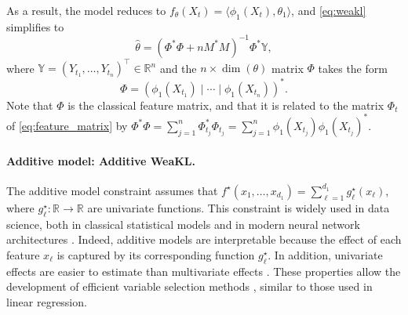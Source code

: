 As a result, the model reduces to $f_{\theta}(X_t) = \langle \phi_1(X_t), \theta_1 \rangle$, and \eqref{eq:weakl} simplifies to
\begin{equation}
    \hat \theta = ( \mathbb \Phi^\ast \mathbb \Phi + n M^\ast M)^{-1}  \mathbb \Phi^\ast \mathbb Y,
    \label{eq:weakl2}
\end{equation}
where $\mathbb Y = (Y_{t_1}, \hdots, Y_{t_n})^\top \in \mathbb R^n$ and the $n\times \dim(\theta)$ matrix $\mathbb \Phi$ takes the form 
\[ \mathbb \Phi = (\phi_1(X_{t_1})\mid \cdots \mid \phi_1(X_{t_n}))^\ast.
\]
Note that $\mathbb \Phi$ is the classical feature matrix, and that it is related to the matrix $\mathbb \Phi_t$ of \eqref{eq:feature_matrix} by $\mathbb \Phi^\ast \mathbb \Phi = \sum_{j=1}^n\mathbb \Phi_{t_j}^\ast \mathbb \Phi_{t_j} = \sum_{j=1}^n \phi_1(X_{t_j}) \phi_1(X_{t_j})^\ast$.

\paragraph{Additive model: Additive WeaKL.} The additive model constraint assumes that $f^\star(x_1, \hdots, x_{d_1}) = \sum_{\ell=1}^{d_1} g_\ell^\star(x_\ell)$, where $g_\ell^\star: \mathbb{R} \to \mathbb{R}$ are univariate functions. This constraint is widely used in data science, both in classical statistical models \citep{hastie1986generalized} and in modern neural network architectures \citep{agarwal2021neural}. Indeed, additive models are interpretable because the effect of each feature $x_\ell$ is captured by its corresponding function $g_\ell^\star$. In addition, univariate effects are easier to estimate than multivariate effects \citep{Ravikumar2009sparse}. These properties allow the development of efficient variable selection methods \citep[see, for example,][]{marra2011practical}, similar to those used in linear regression.

